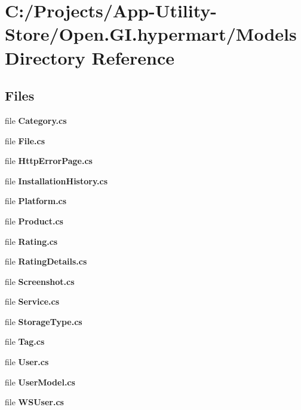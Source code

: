\section{C\+:/\+Projects/\+App-\/\+Utility-\/\+Store/\+Open.G\+I.\+hypermart/\+Models Directory Reference}
\label{dir_1bca5efef4f146ff9432651429456463}
\subsection*{Files}
\begin{DoxyCompactItemize}
\item 
file \textbf{ Category.\+cs}
\item 
file \textbf{ File.\+cs}
\item 
file \textbf{ Http\+Error\+Page.\+cs}
\item 
file \textbf{ Installation\+History.\+cs}
\item 
file \textbf{ Platform.\+cs}
\item 
file \textbf{ Product.\+cs}
\item 
file \textbf{ Rating.\+cs}
\item 
file \textbf{ Rating\+Details.\+cs}
\item 
file \textbf{ Screenshot.\+cs}
\item 
file \textbf{ Service.\+cs}
\item 
file \textbf{ Storage\+Type.\+cs}
\item 
file \textbf{ Tag.\+cs}
\item 
file \textbf{ User.\+cs}
\item 
file \textbf{ User\+Model.\+cs}
\item 
file \textbf{ W\+S\+User.\+cs}
\end{DoxyCompactItemize}
